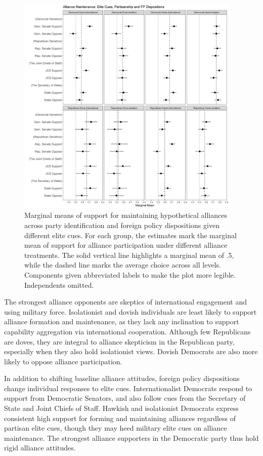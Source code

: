 \documentclass[12pt]{article}
\begin{document}
\begin{figure}
	\centering
		\includegraphics[width=0.95\textwidth]{../figures/party-dispo-main-el.png}
	\caption{Marginal means of support for maintaining hypothetical alliances across party identification and foreign policy dispositions given different elite cues. For each group, the estimates mark the marginal mean of support for alliance participation under different alliance treatments. The solid vertical line highlights a marginal mean of .5, while the dashed line marks the average choice across all levels. Components given abbreviated labels to make the plot more legible. Independents omitted.}
	\label{fig:party-dispo-main-el}
\end{figure}


The strongest alliance opponents are skeptics of international engagement and using military force. 
Isolationist and dovish individuals are least likely to support alliance formation and maintenance, as they lack any inclination to support capability aggregation via international cooperation.
Although few Republicans are doves, they are integral to alliance skepticism in the Republican party, especially when they also hold isolationist views.
Dovish Democrats are also more likely to oppose alliance participation.  


In addition to shifting baseline alliance attitudes, foreign policy dispositions change individual responses to elite cues. 
Internationalist Democrats respond to support from Democratic Senators, and also follow cues from the Secretary of State and Joint Chiefs of Staff. 
Hawkish and isolationist Democrats express consistent high support for forming and maintaining alliances regardless of partisan elite cues, though they may heed military elite cues on alliance maintenance. 
The strongest alliance supporters in the Democratic party thus hold rigid alliance attitudes.
\end{document}
